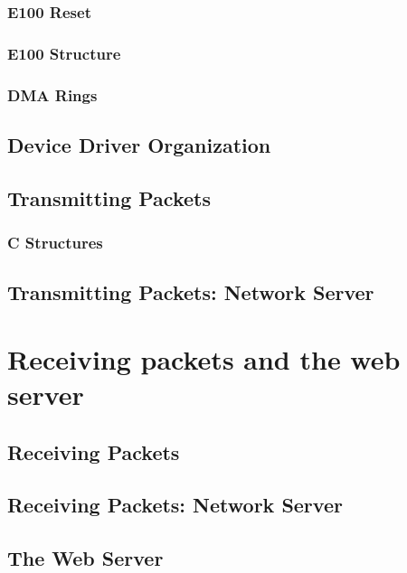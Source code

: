 \documentclass{article}
\begin{document}
\begin{CJK*}{UTF8}{gkai}
\subsubsection{E100 Reset}

\subsubsection{E100 Structure}


\subsubsection{DMA Rings}

\subsection{Device Driver Organization}

\subsection{Transmitting Packets}

\subsubsection{C Structures}

\subsection{Transmitting Packets: Network Server}


\section{Receiving packets and the web server}

\subsection{Receiving Packets}

\subsection{Receiving Packets: Network Server}

\subsection{The Web Server}


\end{CJK*}
\end{document}
